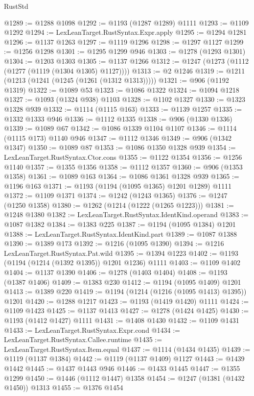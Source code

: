 \begin{lexlean}{RustStd}
\begin{coremodule}
@1289 := @1288 @1098
@1292 := @1193 (@1287 @1289) @1111
@1293 := @1109 @1292
@1294 := LexLeanTarget.RustSyntax.Expr.apply
@1295 := @1294 @1281
@1296 := @1137 @1263
@1297 := @1119 @1296
@1298 := @1297 @1127
@1299 := @1256 @1298
@1301 := @1295 @1299 @946
@1303 := @1278 (@1293 @1301)
@1304 := @1203 @1303
@1305 := @1137 @1266
@1312 := @1247 (@1273 (@1112 (@1277 (@1119 (@1304 @1305) @1127))))
@1313 := @2 @1246
@1319 := @1211 (@1213 (@1241 (@1245 (@1261 (@1312 @1313)))))
@1321 := @906 (@1192 @1319)
@1322 := @1089 @53
@1323 := @1086 @1322
@1324 := @1094 @1218
@1327 := @1093 (@1324 @938) @1103
@1328 := @1102 @1327
@1330 := @1323 @1328 @939
@1332 := @1114 (@1115 @163)
@1333 := @1139 @1257
@1335 := @1332 @1333 @946
@1336 := @1112 @1335
@1338 := @906 (@1330 @1336)
@1339 := @1089 @67
@1342 := @1086 @1339 @1104 @1107
@1346 := @1114 (@1115 @173) @1140 @946
@1347 := @1112 @1346
@1349 := @906 (@1342 @1347)
@1350 := @1089 @87
@1353 := @1086 @1350 @1328 @939
@1354 := LexLeanTarget.RustSyntax.Ctor.cons
@1355 := @1122 @1354
@1356 := @1256 @1140
@1357 := @1355 @1356
@1358 := @1112 @1357
@1360 := @906 (@1353 @1358)
@1361 := @1089 @163
@1364 := @1086 @1361 @1328 @939
@1365 := @1196 @163
@1371 := @1193 (@1194 (@1095 @1365) @1201 @1289) @1111
@1372 := @1109 @1371
@1374 := @1242 (@1243 @1365)
@1376 := @1247 (@1250 @1358)
@1380 := @1262 (@1214 (@1222 (@1265 @1223)))
@1381 := @1248 @1380
@1382 := LexLeanTarget.RustSyntax.IdentKind.operand
@1383 := @1087 @1382
@1384 := @1383 @225
@1387 := @1194 (@1095 @1384) @1201
@1388 := LexLeanTarget.RustSyntax.IdentKind.part
@1389 := @1087 @1388
@1390 := @1389 @173
@1392 := @1216 (@1095 @1390)
@1394 := @1216 LexLeanTarget.RustSyntax.Pat.wild
@1395 := @1394 @1223
@1402 := @1193 (@1194 (@1214 (@1392 @1395)) @1201 @1236) @1111
@1403 := @1109 @1402
@1404 := @1137 @1390
@1406 := @1278 (@1403 @1404)
@1408 := @1193 (@1387 @1406)
@1409 := @1383 @230
@1412 := @1194 (@1095 @1409) @1201
@1413 := @1389 @220
@1419 := @1194 (@1214 (@1216 (@1095 @1413) @1395)) @1201
@1420 := @1288 @1217
@1423 := @1193 (@1419 @1420) @1111
@1424 := @1109 @1423
@1425 := @1137 @1413
@1427 := @1278 (@1424 @1425)
@1430 := @1193 (@1412 @1427) @1111
@1431 := @1408 @1430
@1432 := @1109 @1431
@1433 := LexLeanTarget.RustSyntax.Expr.cond
@1434 := LexLeanTarget.RustSyntax.Callee.runtime
@1435 := LexLeanTarget.RustSyntax.Item.equal
@1437 := @1114 (@1434 @1435)
@1439 := @1119 (@1137 @1384)
@1442 := @1119 (@1137 @1409) @1127
@1443 := @1439 @1442
@1445 := @1437 @1443 @946
@1446 := @1433 @1445
@1447 := @1355 @1299
@1450 := @1446 (@1112 @1447) @1358
@1454 := @1247 (@1381 (@1432 @1450)) @1313
@1455 := @1376 @1454

\end{coremodule}
\end{lexlean}
